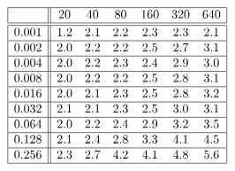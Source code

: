 \[
\begin{array}{|c||cccccc|}
\hline 
& 20 & 40 & 80 & 160 & 320 & 640\\
\hline \hline 
0.001 & 1.2 & 2.1 & 2.2 & 2.3 & 2.3 & 2.1 \\ \hline 
0.002 & 2.0 & 2.2 & 2.2 & 2.5 & 2.7 & 3.1 \\ \hline 
0.004 & 2.0 & 2.2 & 2.3 & 2.4 & 2.9 & 3.0 \\ \hline 
0.008 & 2.0 & 2.2 & 2.2 & 2.5 & 2.8 & 3.1 \\ \hline 
0.016 & 2.0 & 2.1 & 2.3 & 2.5 & 2.8 & 3.2 \\ \hline 
0.032 & 2.1 & 2.1 & 2.3 & 2.5 & 3.0 & 3.1 \\ \hline 
0.064 & 2.0 & 2.2 & 2.4 & 2.9 & 3.2 & 3.5 \\ \hline 
0.128 & 2.1 & 2.4 & 2.8 & 3.3 & 4.1 & 4.5 \\ \hline 
0.256 & 2.3 & 2.7 & 4.2 & 4.1 & 4.8 & 5.6 \\ \hline 
\end{array}
\]

